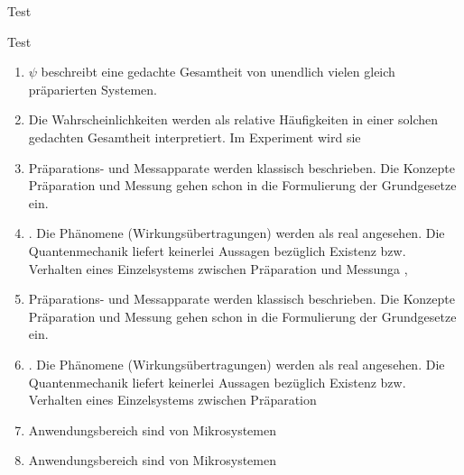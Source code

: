 \documentclass[12pt,ngerman,twoside]{scrbook}
\begin{document}
Test\smash{\rule[-2cm]{2pt}{2cm}}
%
\lipsum[1]\lipsum[1]

\begin{mdframed}[frametitle={page break \lipsum[1]\lipsum[1]}]
Test

\begin{enumerate}
\itemsep=0pt
\item  $\psi$ beschreibt\smash{\rule[0.8\ht\strutbox]{2pt}{.5cm}} eine gedachte Gesamtheit von unendlich vielen gleich präparierten Systemen.
\item Die Wahrscheinlichkeiten werden als relative Häufigkeiten in einer solchen gedachten Gesamtheit interpretiert. Im Experiment wird sie 
\item Präparations- und Messapparate werden klassisch beschrieben. Die Konzepte Präparation und Messung gehen schon in die Formulierung der Grundgesetze ein.
\item. Die Phänomene (Wirkungsübertragungen) werden als real angesehen. Die Quantenmechanik liefert keinerlei Aussagen bezüglich Existenz bzw. Verhalten eines Einzelsystems zwischen Präparation
und Messunga ,
\item Präparations- und Messapparate werden klassisch beschrieben. Die Konzepte Präparation und Messung gehen schon in die Formulierung der Grundgesetze ein.
\item. Die Phänomene (Wirkungsübertragungen) werden als real angesehen. Die Quantenmechanik liefert keinerlei Aussagen bezüglich Existenz bzw. Verhalten eines Einzelsystems zwischen Präparation
\item Anwendungsbereich sind von Mikrosystemen
\item Anwendungsbereich sind von Mikrosystemen
\end{enumerate}
\lipsum[1]\lipsum[1]
\lipsum[1]\lipsum[1]
\end{mdframed}

\noindent\null\smash{\rlap{\rule[4cm]{1cm}{2pt}}%
\rlap{\rule[6cm]{2cm}{2pt}}%
\rlap{\rule[8cm]{3cm}{2pt}}}
\hfill\smash{\llap{\rule[4cm]{1cm}{2pt}}%
\llap{\rule[6cm]{2cm}{2pt}}%
\llap{\rule[8cm]{3cm}{2pt}}}
\end{document}
